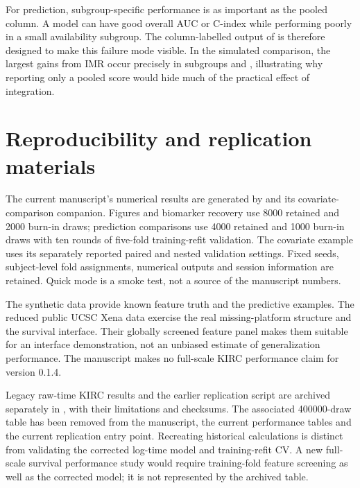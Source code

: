 \documentclass[article]{jss}
\begin{document}
For prediction, subgroup-specific performance is as important as the pooled
column.  A model can have good overall AUC or C-index while performing poorly in
a small availability subgroup.  The column-labelled output of 
is therefore designed to make this failure mode visible.  In the simulated
comparison, the largest gains from IMR occur precisely in subgroups
 and , illustrating why reporting only a pooled score would
hide much of the practical effect of integration.

\section{Reproducibility and replication materials}\label{sec:reproducibility}

The current manuscript's numerical results are generated by
 and its covariate-comparison companion.
Figures and biomarker recovery use 8000 retained and 2000 burn-in draws;
prediction comparisons use 4000 retained and 1000 burn-in draws with ten rounds
of five-fold training-refit validation. The covariate example uses its separately
reported paired and nested validation settings. Fixed seeds, subject-level fold
assignments, numerical outputs and session information are retained. Quick mode
is a smoke test, not a source of the manuscript numbers.

The synthetic  data provide known feature truth and the predictive
examples. The reduced public UCSC Xena  data exercise the real
missing-platform structure and the survival interface. Their globally screened
feature panel makes them suitable for an interface demonstration, not an unbiased
estimate of generalization performance. The manuscript makes no full-scale KIRC
performance claim for version 0.1.4.

Legacy raw-time KIRC results and the earlier replication script are archived
separately in , with their limitations and checksums.
The associated 400000-draw table has been removed from the manuscript, the
current performance tables and the current replication entry point. Recreating
historical calculations is distinct from validating the corrected log-time
model and training-refit CV. A new full-scale survival performance study would
require training-fold feature screening as well as the corrected model; it is
not represented by the archived table.
\end{document}
